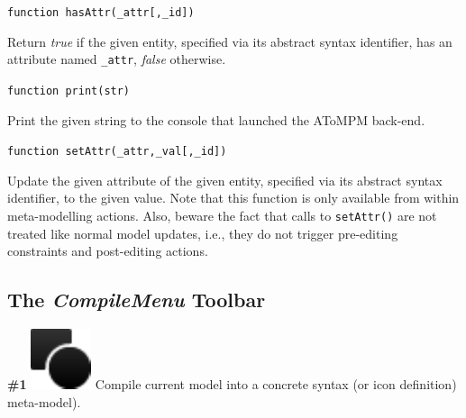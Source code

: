 \documentclass{article}
\numberwithin{equation}{section}
\numberwithin{figure}{section}
\begin{document}
\begin{center}	{\large \texttt{function hasAttr(\_attr[,\_id])}} \end{center}

Return \textit{true} if the given entity, specified via its abstract syntax identifier, has an attribute named \texttt{\_attr}, \textit{false} otherwise.\\
\vspace*{1em}


\begin{center}	{\large \texttt{function print(str)}} \end{center}

Print the given string to the console that launched the AToMPM back-end.\\
\vspace*{1em}


\begin{center}	{\large \texttt{function setAttr(\_attr,\_val[,\_id])}} \end{center}

Update the given attribute of the given entity, specified via its abstract syntax identifier, to the given value. Note that this function is only available from within meta-modelling actions. Also, beware the fact that calls to \texttt{setAttr()} are not treated like normal model updates, i.e., they do not trigger pre-editing constraints and post-editing actions.



\subsection{The \textit{CompileMenu} Toolbar}
\label{ssec:compiletb}
\textbf{\#1} \hspace*{1cm}
\includegraphics[scale=0.5]{figures/icon_compileToCSMM} \hspace*{1cm}
Compile current model into a concrete syntax (or icon definition) meta-model).\\
\end{document}
